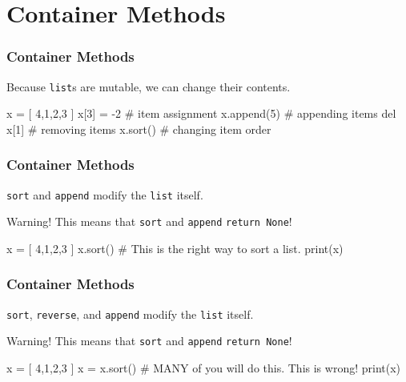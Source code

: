 \documentclass[11pt]{beamer}
\begin{document}
\section{Container Methods}

\begin{frame}[fragile]
  \frametitle{Container Methods}
  \Enlarge

  \begin{itemize}
  \myitem  Because \texttt{list}s are mutable, we can change their contents. %
  \end{itemize}
  \begin{semiverbatim}
x = [ 4,1,2,3 ]
x[3] = -2       # item assignment
x.append(5)     # appending items
del x[1]        # removing items
x.sort()        # changing item order
  \end{semiverbatim}
\end{frame}

\begin{frame}[fragile]
  \frametitle{Container Methods}
  \Enlarge

  \begin{itemize}
  \myitem  \texttt{sort} and \texttt{append} modify the \texttt{list} itself. %
  \end{itemize}
  \begin{alertblock}{Warning!}
  This means that \texttt{sort} and \texttt{append} \texttt{return None}!
  \end{alertblock}
  \begin{semiverbatim}
x = [ 4,1,2,3 ]
x.sort()        # This is the right way to sort a list.
print(x)
  \end{semiverbatim}
\end{frame}

\begin{frame}[fragile]
  \frametitle{Container Methods}
  \Enlarge

  \begin{itemize}
  \myitem  \texttt{sort}, \texttt{reverse}, and \texttt{append} modify the \texttt{list} itself.
  \end{itemize}
  \begin{alertblock}{Warning!}
  This means that \texttt{sort} and \texttt{append} \texttt{return None}!
  \end{alertblock}
  \begin{semiverbatim}
x = [ 4,1,2,3 ]
x = x.sort()    # MANY of you will do this.  This is wrong!
print(x)
  \end{semiverbatim}
\end{frame}
\end{document}
